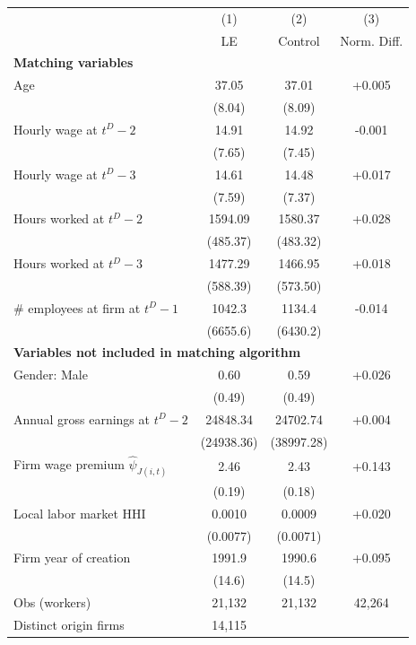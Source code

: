 {
\begin{tabular}{lccc}
\hline\hline
 & (1) & (2) & (3) \\
 & LE & Control & Norm. Diff. \\
\hline
\multicolumn{4}{l}{\textbf{Matching variables}} \\
Age & 37.05 & 37.01 & +0.005 \\
 & (8.04) & (8.09) &  \\
Hourly wage at $t^D-2$ & 14.91 & 14.92 & -0.001 \\
 & (7.65) & (7.45) &  \\
Hourly wage at $t^D-3$ & 14.61 & 14.48 & +0.017 \\
 & (7.59) & (7.37) &  \\
Hours worked at $t^D-2$ & 1594.09 & 1580.37 & +0.028 \\
 & (485.37) & (483.32) &  \\
Hours worked at $t^D-3$ & 1477.29 & 1466.95 & +0.018 \\
 & (588.39) & (573.50) &  \\
\# employees at firm at $t^D-1$ & 1042.3 & 1134.4 & -0.014 \\
 & (6655.6) & (6430.2) &  \\
\multicolumn{4}{l}{\textbf{Variables not included in matching algorithm}} \\
Gender: Male & 0.60 & 0.59 & +0.026 \\
 & (0.49) & (0.49) &  \\
Annual gross earnings at $t^D-2$ & 24848.34 & 24702.74 & +0.004 \\
 & (24938.36) & (38997.28) &  \\
Firm wage premium $\widehat{\psi}_{J(i,t)}$ & 2.46 & 2.43 & +0.143 \\
 & (0.19) & (0.18) &  \\
Local labor market HHI & 0.0010 & 0.0009 & +0.020 \\
 & (0.0077) & (0.0071) &  \\
Firm year of creation & 1991.9 & 1990.6 & +0.095 \\
 & (14.6) & (14.5) &  \\
\hline
Obs (workers) & 21,132 & 21,132 & 42,264 \\
Distinct origin firms & 14,115 &  &  \\
\hline\hline
\end{tabular}
}
